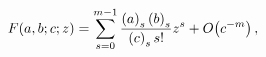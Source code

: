 \[\mathop{F\/}\nolimits\!\left(a,b;c;z\right)=\sum_{s=0}^{m-1}\frac{\left(a%
\right)_{s}\left(b\right)_{s}}{\left(c\right)_{s}s!}z^{s}+\mathop{O\/}%
\nolimits\!\left(c^{-m}\right),\]